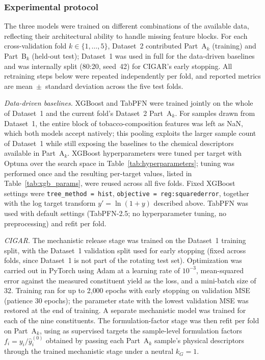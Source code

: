 ﻿\documentclass[a4paper,fleqn]{cas-sc}
\begin{document}
\subsubsection{Experimental protocol}

The three models were trained on different combinations of the available
data, reflecting their architectural ability to handle missing feature
blocks. For each cross-validation fold $k\in\{1,\ldots,5\}$, Dataset~2
contributed Part~A$_k$ (training) and Part~B$_k$ (held-out test); Dataset~1
was used in full for the data-driven baselines and was internally split
(80:20, seed~42) for CIGAR's early stopping. All retraining steps below
were repeated independently per fold, and reported metrics are
mean~$\pm$~standard deviation across the five test folds.

\emph{Data-driven baselines.} XGBoost and TabPFN were trained jointly on the
whole of Dataset~1 and the current fold's Dataset~2 Part~A$_k$. For samples
drawn from Dataset~1, the entire block of tobacco-composition features was
left as NaN, which both models accept natively; this pooling exploits the
larger sample count of Dataset~1 while still exposing the baselines to the
chemical descriptors available in Part~A$_k$. XGBoost hyperparameters were
tuned per target with Optuna \cite{akiba2019optuna} over the search space
in Table~\ref{tab:hyperparameters}; tuning was performed once and the
resulting per-target values, listed in Table~\ref{tab:xgb_params}, were
reused across all five folds. Fixed XGBoost settings were
\texttt{tree\_method = hist}, \texttt{objective = reg:squarederror},
together with the log target transform $y' = \ln(1+y)$ described above.
TabPFN was used with default settings (TabPFN-2.5; no hyperparameter
tuning, no preprocessing) and refit per fold.

\emph{CIGAR.} The mechanistic release stage was trained on the Dataset~1
training split, with the Dataset~1 validation split used for early stopping
(fixed across folds, since Dataset~1 is not part of the rotating test
set). Optimization was carried out in PyTorch using Adam at a learning rate
of $10^{-3}$, mean-squared error against the measured constituent yield as
the loss, and a mini-batch size of 32. Training ran for up to 2{,}000
epochs with early stopping on validation MSE (patience 30 epochs); the
parameter state with the lowest validation MSE was restored at the end of
training. A separate mechanistic model was trained for each of the nine
constituents. The formulation-factor stage was then refit per fold on
Part~A$_k$, using as supervised targets the sample-level formulation
factors $f_i = y_i / \hat{y}_i^{(0)}$ obtained by passing each Part~A$_k$
sample's physical descriptors through the trained mechanistic stage under
a neutral $k_G = 1$.
\end{document}
